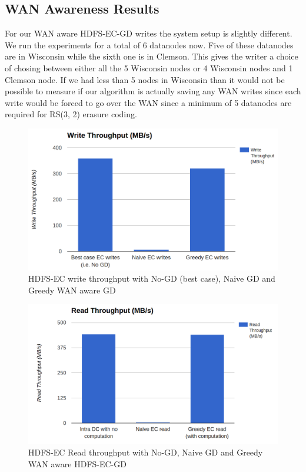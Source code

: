 \documentclass{sig-alternate-05-2015}
\begin{document}
\subsection{WAN Awareness Results}
For our WAN aware HDFS-EC-GD writes the system setup is slightly different. We run the experiments for a total of 6 datanodes now. Five of these datanodes are in Wisconsin while the sixth one is in Clemson. This gives the writer a choice of chosing between either all the 5 Wisconsin nodes or 4 Wisconsin nodes and 1 Clemson node. If we had less than 5 nodes in Wisconsin than it would not be possible to measure if our algorithm is actually saving any WAN writes since each write would be forced to go over the WAN since a minimum of 5 datanodes are required for RS(3, 2) erasure coding.

\begin{figure}

\centering
\includegraphics[scale=0.25]{greedy_write_tput.png}
\caption{HDFS-EC write throughput with No-GD (best case), Naive GD and Greedy WAN aware GD}
\label{greedyTput}
\end{figure} 

\begin{figure}
\centering
\includegraphics[scale=0.23]{greedy_read_tput.png}
\caption{HDFS-EC Read throughput with No-GD, Naive GD and Greedy WAN aware HDFS-EC-GD}
\label{greedyReadTput}

\end{figure} 
\end{document}
